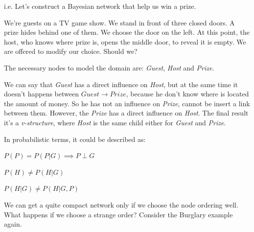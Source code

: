 \begin{example}
    i.e. Let's construct a Bayesian network that help us win a prize. \vspace{3.5pt}

    We're guests on a TV game show. We stand in front of three closed doors. A prize hides behind one of them. We choose the door on the left. At this point, the host,
    who knows where prize is, opens the middle door, to reveal it is empty. We are offered to modify our choice. Should we? \vspace{7pt}

    The necessary nodes to model the domain are: \textit{Guest}, \textit{Host} and \textit{Prize}. \vspace{3.5pt}

    We can say that \textit{Guest} has a direct influence on \textit{Host}, but at the same time it doesn't happens between \textit{$Guest \rightarrow Prize$},
    because he don't know where is located the amount of money. So he has not an influence on \textit{Prize}, cannot be insert a link between them. However, the \textit{Prize}
    has a direct influence on \textit{Host}. The final result it's a \textit{v-structure}, where \textit{Host} is the same child either for \textit{Guest} and \textit{Prize}. \vspace{3.5pt}
    
    In probabilistic terms, it could be described as: \vspace{3.5pt}
    
    $P(P) = P(P|G) \implies P \perp G$

    $P(H) \neq P(H|G)$

    $P(H|G) \neq P(H|G, P)$
\end{example}
We can get a quite compact network only if we choose the node ordering well. What happens if we choose a strange order? Consider the Burglary example again.

